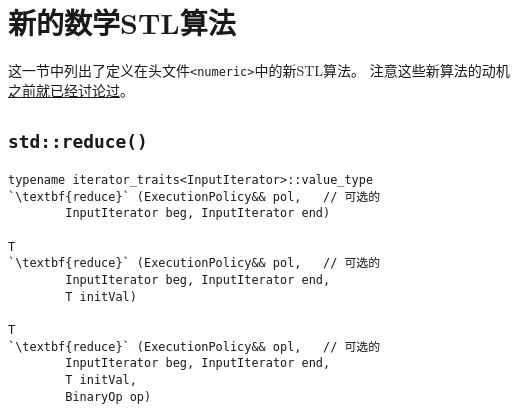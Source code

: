 \section{新的数学STL算法}
这一节中列出了定义在头文件\texttt{<numeric>}中的新STL算法。
注意这些新算法的动机\hyperref[ch22.6]{之前就已经讨论过}。

\subsection{\texttt{std::reduce()}}\label{ch23.2.1}
\begin{lstlisting}[frame=single,xleftmargin=13pt,xrightmargin=13pt]
typename iterator_traits<InputIterator>::value_type
`\textbf{reduce}` (ExecutionPolicy&& pol,   // 可选的
        InputIterator beg, InputIterator end)

T
`\textbf{reduce}` (ExecutionPolicy&& pol,   // 可选的
        InputIterator beg, InputIterator end,
        T initVal)

T
`\textbf{reduce}` (ExecutionPolicy&& opl,   // 可选的
        InputIterator beg, InputIterator end,
        T initVal,
        BinaryOp op)
\end{lstlisting}
